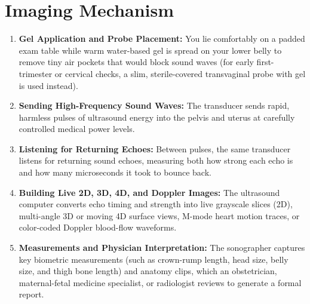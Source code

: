 \section{Imaging Mechanism}
\begin{enumerate}
\item \textbf{Gel Application and Probe Placement:} You lie comfortably on a padded exam table while warm water-based gel is spread on your lower belly to remove tiny air pockets that would block sound waves (for early first-trimester or cervical checks, a slim, sterile-covered transvaginal probe with gel is used instead).
\item \textbf{Sending High-Frequency Sound Waves:} The transducer sends rapid, harmless pulses of ultrasound energy into the pelvis and uterus at carefully controlled medical power levels.
\item \textbf{Listening for Returning Echoes:} Between pulses, the same transducer listens for returning sound echoes, measuring both how strong each echo is and how many microseconds it took to bounce back.
\item \textbf{Building Live 2D, 3D, 4D, and Doppler Images:} The ultrasound computer converts echo timing and strength into live grayscale slices (2D), multi-angle 3D or moving 4D surface views, M-mode heart motion traces, or color-coded Doppler blood-flow waveforms.
\item \textbf{Measurements and Physician Interpretation:} The sonographer captures key biometric measurements (such as crown-rump length, head size, belly size, and thigh bone length) and anatomy clips, which an obstetrician, maternal-fetal medicine specialist, or radiologist reviews to generate a formal report.
\end{enumerate}

